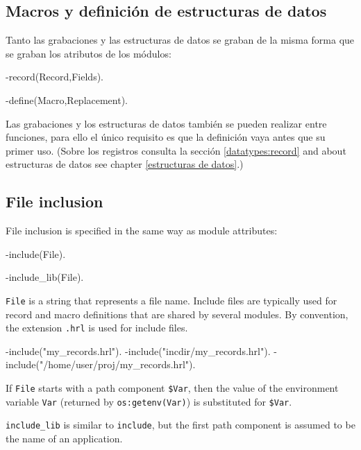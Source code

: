 \subsection{Macros y definici\'on de estructuras de datos}

Tanto las grabaciones y las estructuras de datos se graban de la misma forma que se graban los atributos de los m\'odulos: 

\begin{erlang}
-record(Record,Fields).

-define(Macro,Replacement).
\end{erlang}
Las grabaciones y los estructuras de datos tambi\'en se pueden realizar entre funciones, para ello el \'unico requisito es que la definici\'on vaya antes que su primer uso. (Sobre los registros consulta la secci\'on \ref{datatypes:record} and about estructuras de datos see chapter \ref{estructuras de datos}.)

\subsection{File inclusion}

File inclusion is specified in the same way as module attributes:

\begin{erlang}
-include(File).

-include_lib(File).
\end{erlang}

\texttt{File} is a string that represents a file name. Include files
are typically used for record and macro definitions that are shared by
several modules. By convention, the extension \texttt{.hrl} is used
for include files.

\begin{erlang}
-include("my_records.hrl").
-include("incdir/my_records.hrl").
-include("/home/user/proj/my_records.hrl").
\end{erlang}

If \texttt{File} starts with a path component \texttt{\$Var}, then the value of
the environment variable \texttt{Var} (returned by
\texttt{os:getenv(Var)}) is substituted for \texttt{\$Var}.


\texttt{include\_lib} is similar to \texttt{include}, but the
first path component is assumed to be the name of an application.

